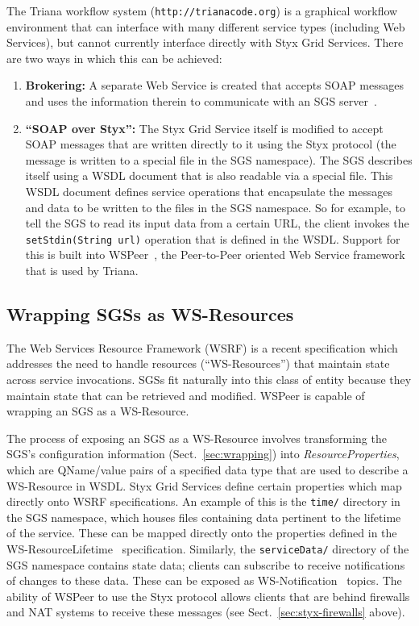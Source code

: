 \documentclass{llncs}
\begin{document}
The Triana workflow system ({\tt http://trianacode.org}) is a graphical workflow environment that can interface with many different service types (including Web Services), but cannot currently interface directly with Styx Grid Services.  There are two ways in which this can be achieved:
\begin{enumerate}
	\item {\bf Brokering:} A separate Web Service is created that accepts SOAP messages and uses the information therein to communicate with an SGS server~\cite{blower:2005}.
	\item {\bf ``SOAP over Styx'':} The Styx Grid Service itself is modified to accept SOAP messages that are written directly to it using the Styx protocol (the message is written to a special file in the SGS namespace).  The SGS describes itself using a WSDL document that is also readable via a special file.  This WSDL document defines service operations that encapsulate the messages and data to be written to the files in the SGS namespace.  So for example, to tell the SGS to read its input data from a certain URL, the client invokes the {\tt setStdin(String url)} operation that is defined in the WSDL.  Support for this is built into WSPeer~\cite{wspeer}, the Peer-to-Peer oriented Web Service framework that is used by Triana.
\end{enumerate}

\subsection{Wrapping SGSs as WS-Resources}\label{subsec:ws-resources}

The Web Services Resource Framework (WSRF) is a recent specification which addresses the need to handle resources (``WS-Resources'') that maintain state across service invocations.  SGSs fit naturally into this class of entity because they maintain state that can be retrieved and modified.  WSPeer is capable of wrapping an SGS as a WS-Resource.

The process of exposing an SGS as a WS-Resource involves transforming the SGS's configuration information (Sect.~\ref{sec:wrapping}) into {\em ResourceProperties\/}, which are QName/value pairs of a specified data type that are used to describe a WS-Resource in WSDL.  Styx Grid Services define certain properties which map directly onto WSRF specifications.  An example of this is the {\tt time/} directory in the SGS namespace, which houses files containing data pertinent to the lifetime of the service.  These can be mapped directly onto the properties defined in the WS-ResourceLifetime~\cite{wsrf-lifetime} specification.  Similarly, the {\tt serviceData/} directory of the SGS namespace contains state data; clients can subscribe to receive notifications of changes to these data.  These can be exposed as WS-Notification~\cite{wsrf-notification} topics.  The ability of WSPeer to use the Styx protocol allows clients that are behind firewalls and NAT systems to receive these messages (see Sect.~\ref{sec:styx-firewalls} above).
\end{document}
